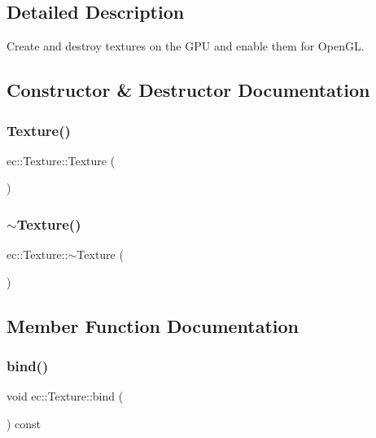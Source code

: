 \subsection{Detailed Description}
Create and destroy textures on the G\+PU and enable them for Open\+GL. 

\subsection{Constructor \& Destructor Documentation}
\mbox{\label{classec_1_1_texture_ac2551ef676d0c771f35dc470b8a0b237}} 
\subsubsection{\texorpdfstring{Texture()}{Texture()}}
{\footnotesize\ttfamily ec\+::\+Texture\+::\+Texture (\begin{DoxyParamCaption}{ }\end{DoxyParamCaption})\hspace{0.3cm}{\ttfamily [explicit]}}

\mbox{\label{classec_1_1_texture_ae567d80654dd09c6b02a38ca8de29ead}} 
\subsubsection{\texorpdfstring{$\sim$\+Texture()}{~Texture()}}
{\footnotesize\ttfamily ec\+::\+Texture\+::$\sim$\+Texture (\begin{DoxyParamCaption}{ }\end{DoxyParamCaption})\hspace{0.3cm}{\ttfamily [default]}}



\subsection{Member Function Documentation}
\mbox{\label{classec_1_1_texture_a9e2f0191cfcc85c87edb821508cc06ee}} 
\subsubsection{\texorpdfstring{bind()}{bind()}}
{\footnotesize\ttfamily void ec\+::\+Texture\+::bind (\begin{DoxyParamCaption}{ }\end{DoxyParamCaption}) const}



